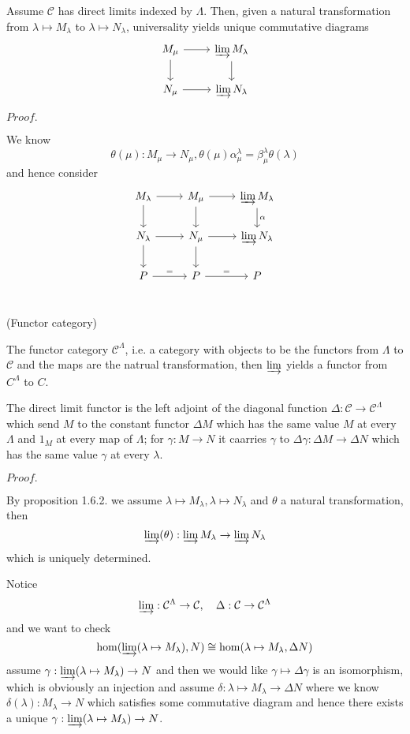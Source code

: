 \documentclass{article}
\newcommand{\Pf}[1]{$Proof.$\par}
\begin{document}
    \begin{proposition}
        Assume $\mathcal{C}$ has direct limits indexed by $\Lambda$. Then, given a natural transformation from $\lambda \mapsto M_{\lambda}$ to $\lambda \mapsto N_{\lambda}$, universality yields unique commutative diagrams
        \[
        \begin{tikzcd}
            M_{\mu}\arrow[r]\arrow[d] & \varinjlim M_{\lambda}\arrow[d] \\
            N_{\mu}\arrow[r] & \varinjlim N_{\lambda} 
        \end{tikzcd}
        \]
    \end{proposition}
    \Pf\par
        We know 
        \[\theta(\mu):M_{\mu} \to N_{\mu}, \theta(\mu)\alpha^{\lambda}_{\mu} = \beta^{\lambda}_{\mu}\theta(\lambda)\]
        and hence consider
        \[
        \begin{tikzcd}
             M_{\lambda}\arrow[r]\arrow[d] & M_{\mu}\arrow[r]\arrow[d] & \varinjlim M_{\lambda}\arrow[d,"\alpha"] \\
             N_{\lambda}\arrow[r]\arrow[d] & N_{\mu}\arrow[r]\arrow[d] & \varinjlim N_{\lambda}  \\
             P\arrow[r,"="] & P\arrow[r,"="] & P \\
        \end{tikzcd}
        \]
    \begin{definition}
        (Functor category)\par
        The functor category $\mathcal{C}^{\Lambda}$, i.e. a category with objects to be the functors from $\Lambda$ to $\mathcal{C}$ and the maps are the natrual transformation, then $\varinjlim$ yields a functor from $C^{\Lambda}$ to $C$.\par
        The direct  limit functor is the left adjoint of the diagonal function $\Delta:\mathcal{C} \to \mathcal{C}^{\Lambda}$ which send $M$ to the constant functor $\Delta M$ which has the same value $M$ at every $\Lambda$ and $1_M$ at every map of $\Lambda$; for $\gamma:M\to N$ it caarries $\gamma$ to $\Delta \gamma: \Delta M \to \Delta N$ which has the same value $\gamma$ at every $\lambda$.
    \end{definition}
    \Pf\par
        By proposition 1.6.2. we assume $\lambda\mapsto M_{\lambda},\lambda\mapsto N_{\lambda}$ and $\theta$ a natural transformation, then
        \[\varinjlim(\theta): \varinjlim M_{\lambda} \to \varinjlim N_{\lambda}\]
        which is uniquely determined.\par
        Notice
        \[\varinjlim: \mathcal{C}^{\Lambda} \to \mathcal{C},\quad \Delta: \mathcal{C} \to \mathcal{C}^{\Lambda}\]
        and we want to check
        \[\hom (\varinjlim (\lambda\mapsto M_{\lambda}), N) \cong \hom(\lambda\mapsto M_{\lambda},\Delta N)\]
        assume $\gamma: \varinjlim (\lambda\mapsto M_{\lambda}) \to N$ and then we would like $\gamma \mapsto \Delta \gamma$ is an isomorphism, which is obviously an injection and assume $\delta:\lambda\mapsto M_{\lambda} \to \Delta N$ where we know $\delta(\lambda):M_{\lambda} \to N$ which satisfies some commutative diagram and hence there exists a unique $\gamma: \varinjlim (\lambda\mapsto M_{\lambda}) \to N$.
\end{document}
